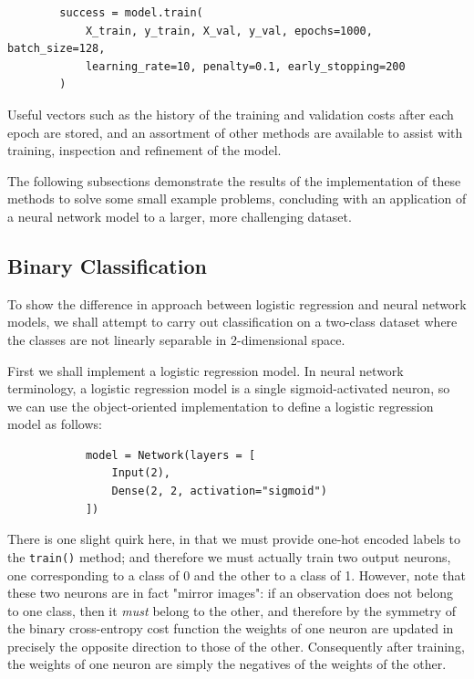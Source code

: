 \documentclass{article}[11pt]
\begin{document}
    
    \begin{verbatim}
        success = model.train(
            X_train, y_train, X_val, y_val, epochs=1000, batch_size=128,
            learning_rate=10, penalty=0.1, early_stopping=200
        )
    \end{verbatim}
    
    
    Useful vectors such as the history of the training and validation costs after each epoch are stored, and an assortment of other methods are available to assist with training, inspection and refinement of the model.
    
    The following subsections demonstrate the results of the implementation of these methods to solve some small example problems, concluding with an application of a neural network model to a larger, more challenging dataset.
    
    

    \subsection{Binary Classification}
        
        To show the difference in approach between logistic regression and neural network models, we shall attempt to carry out classification on a two-class dataset where the classes are not linearly separable in 2-dimensional space.
        
        First we shall implement a logistic regression model. In neural network terminology, a logistic regression model is a single sigmoid-activated neuron, so we can use the object-oriented implementation to define a logistic regression model as follows:
        
        \begin{verbatim}
            model = Network(layers = [
                Input(2),
                Dense(2, 2, activation="sigmoid")
            ])
        \end{verbatim}
        
        There is one slight quirk here, in that we must provide one-hot encoded labels to the \texttt{train()} method; and therefore we must actually train two output neurons, one corresponding to a class of 0 and the other to a class of 1. However, note that these two neurons are in fact "mirror images": if an observation does not belong to one class, then it \textit{must} belong to the other, and therefore by the symmetry of the binary cross-entropy cost function the weights of one neuron are updated in precisely the opposite direction to those of the other. Consequently after training, the weights of one neuron are simply the negatives of the weights of the other.
        
\end{document}
